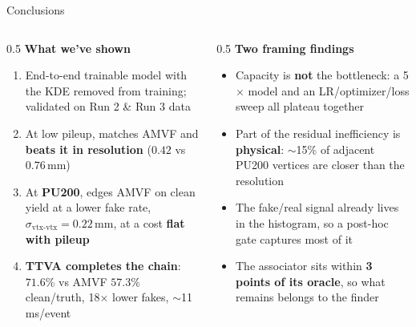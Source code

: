 \documentclass[xcolor=table,aspectratio=169]{beamer}
\begin{document}
\begin{frame}{Conclusions}
    \begin{columns}[t]
        \begin{column}{0.5\linewidth}
            \textbf{What we've shown}
            \begin{enumerate}
                \setlength\itemsep{0.4em}
                \item End-to-end trainable model with the KDE removed from training; validated on Run 2 \& Run 3 data
                \item At low pileup, matches AMVF and \textbf{beats it in resolution} ($0.42$ vs $0.76$\,mm)
                \item At \textbf{PU200}, edges AMVF on clean yield at a lower fake rate, $\sigma_{\text{vtx-vtx}}=0.22$\,mm, at a cost \textbf{flat with pileup}
                \item \textbf{TTVA completes the chain}: $71.6\%$ vs AMVF $57.3\%$ clean/truth, 18$\times$ lower fakes, $\sim$11\,ms/event
            \end{enumerate}
        \end{column}
        \begin{column}{0.5\linewidth}
            \textbf{Two framing findings}
            \begin{itemize}
                \setlength\itemsep{0.4em}
                \item Capacity is \textbf{not} the bottleneck: a 5$\times$ model and an LR/optimizer/loss sweep all plateau together
                \item Part of the residual inefficiency is \textbf{physical}: $\sim$15\% of adjacent PU200 vertices are closer than the resolution
                \item The fake/real signal already lives in the histogram, so a post-hoc gate captures most of it
                \item The associator sits within \textbf{3 points of its oracle}, so what remains belongs to the finder
            \end{itemize}
        \end{column}
    \end{columns}
\end{frame}
\end{document}
